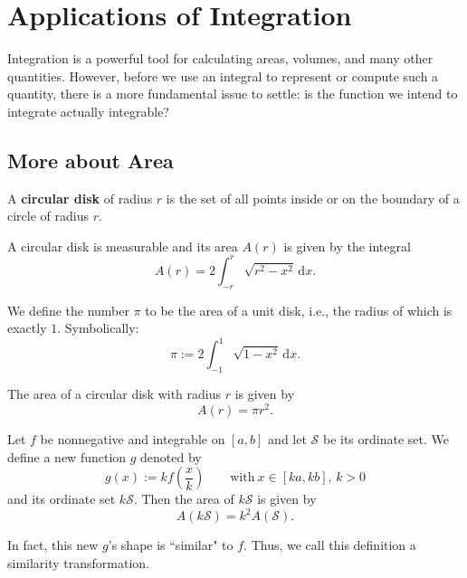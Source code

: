 	\chapter{Applications of Integration}
	Integration is a powerful tool for calculating areas, volumes, and many other quantities. However, before we use an integral to represent or compute such a quantity, there is a more fundamental issue to settle: is the function we intend to integrate actually integrable?
	\section{More about Area}
	\begin{definitionenv}
		A \textbf{circular disk} of radius $r$ is the set of all points inside or on the boundary of a circle of radius $r$.
	\end{definitionenv}
	\begin{theoremenv}
		A circular disk is measurable and its area $A(r)$ is given by the integral
		\[
		A(r) = 2\int_{-r}^r \sqrt{r^2-x^2}\,\mathrm{d}x.
		\]
	\end{theoremenv}
	\begin{definitionenv}
		We define the number $\pi$ to be the area of a unit disk, i.e., the radius of which is exactly $1$. Symbolically: 
		\[
		\pi := 2\int_{-1}^1 \sqrt{1-x^2}\,\mathrm{d}x.
		\]
	\end{definitionenv}
	\begin{corollaryenv}
		The area of a circular disk with radius $r$ is given by
		\[
		A(r)=\pi r^2.
		\] 
	\end{corollaryenv}
	\begin{theoremenv}
		Let $f$ be nonnegative and integrable on $[a,b]$ and let $\mathcal{S}$ be its ordinate set. We define a new function $g$ denoted by
		\[
		g(x):=kf\left( \frac{x}{k}\right) \qquad \text{with}\ x\in[ka,kb],\, k>0
		\]
		and its ordinate set $k\mathcal{S}$. Then the area of $k\mathcal{S}$ is given by
		\[
		A(k\mathcal{S})=k^2A(\mathcal{S}).
		\]
	\end{theoremenv}
	\begin{remarkenv}
		In fact, this new $g$'s shape is ``similar" to $f$. Thus, we call this definition a similarity transformation.
	\end{remarkenv}
